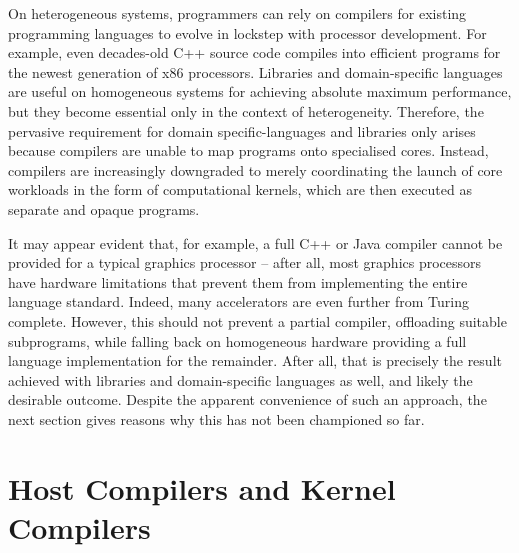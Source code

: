     On heterogeneous systems, programmers can rely on compilers for existing
    programming languages to evolve in lockstep with processor development.
    For example, even decades-old C++ source code compiles into efficient
    programs for the newest generation of x86 processors.
    Libraries and domain-specific languages are useful on homogeneous systems
    for achieving absolute maximum performance, but they become essential only
    in the context of heterogeneity.
    Therefore, the pervasive requirement for domain specific-languages and
    libraries only arises because compilers are unable to map programs onto
    specialised cores.
    Instead, compilers are increasingly downgraded to merely coordinating the
    launch of core workloads in the form of computational kernels, which are
    then executed as separate and opaque programs.

    It may appear evident that, for example, a full C++ or Java compiler cannot
    be provided for a typical graphics processor -- after all, most graphics
    processors have hardware limitations that prevent them from implementing the
    entire language standard.
    Indeed, many accelerators are even further from Turing complete.
    However, this should not prevent a partial compiler, offloading suitable
    subprograms, while falling back on homogeneous hardware providing a full
    language implementation for the remainder.
    After all, that is precisely the result achieved with libraries and
    domain-specific languages as well, and likely the desirable outcome.
    Despite the apparent convenience of such an approach, the next section gives
    reasons why this has not been championed so far.

\section{Host Compilers and Kernel Compilers}
\label{sec:hostkernel}

